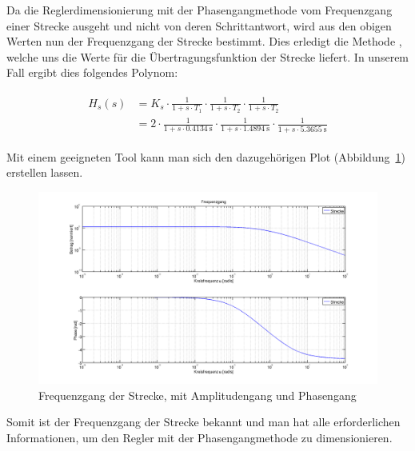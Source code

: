 Da  die  Reglerdimensionierung  mit  der  Phasengangmethode  vom  Frequenzgang
einer  Strecke  ausgeht und  nicht  von  deren  Schrittantwort, wird  aus  den
obigen Werten  nun der Frequenzgang  der Strecke bestimmt.  Dies  erledigt die
Methode  \footnotemark[3],  welche  uns die  Werte  f\"ur  die
\"Ubertragungsfunktion  der  Strecke liefert.   In  unserem  Fall ergibt  dies
folgendes Polynom:


\begin{gather} \label{eq:transfer:plant}
    \begin{split}
        H_s (s) & = K_s
                  \cdot \frac{1}{1 + s \cdot T_1}
                  \cdot \frac{1}{1 + s \cdot T_2}
                  \cdot \frac{1}{1 + s \cdot T_2}                     \\
                & = 2
                  \cdot \frac{1}{1 + s \cdot \SI{0.4134}{\second}}
                  \cdot \frac{1}{1 + s \cdot \SI{1.4894}{\second}}
                  \cdot \frac{1}{1 + s \cdot \SI{5.3655}{\second}}
    \end{split}
\end{gather}

Mit   einem  geeigneten   Tool  kann   man  sich   den  dazugeh\"origen   Plot
(Abbildung~\ref{fig:plant_freq}) erstellen lassen.

\begin{figure}[h! width=\pagewidth]
    \includegraphics[width=\textwidth]{images/streckeFrequenzgang.png}
    \caption{%
        Frequenzgang der Strecke, mit Amplitudengang und Phasengang
    }
    \label{fig:plant_freq}
\end{figure}

Somit ist der Frequenzgang der Strecke bekannt und man hat alle erforderlichen
Informationen, um den Regler mit der Phasengangmethode zu dimensionieren.
